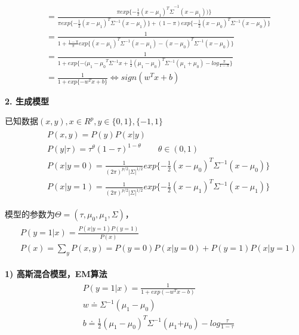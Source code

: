 \documentclass[12pt,UTF8,AutoFakeBold]{article}
\begin{document}
\begin{equation}
\begin{aligned}
&=\frac{\pi exp {\{ -\frac{1}{2} {(x-\mu_1)}^{T}\Sigma}^{-1}{(x-\mu_1))\}}} {\pi exp \{-\frac{1}{2}{(x-\mu_1)}^{T}\Sigma^{-1}(x-\mu_1)\}+(1-\pi)exp\{-\frac{1}{2} {(x-\mu_0)}^{T} \Sigma^{-1}(x-\mu_0)\}}\\
&=\frac{1}{1+\frac{1-\pi}{\pi}exp \{ {(x-\mu_1)}^{T} {\Sigma}^{-1} (x-\mu_1)-{(x-\mu_0)}^{T} {\Sigma}^{-1}(x-{\mu}_{0})\}}\\
&=\frac{1}{1+exp\{-{({\mu}_{1}-{\mu}_{0}}^{T}{\Sigma}^{-1}x+\frac{1}{2}{({\mu}_{1}-{\mu}_{0})}^{T}{\Sigma}^{-1}({\mu}_{1}+{\mu}_{0})-log\frac{\pi}{1-\pi}\}}\\
&=\frac{1}{1+exp\{-w^Tx+b\}} \Leftrightarrow sign(w^Tx+b)
\end{aligned}
\end{equation}

\textbf{2. 生成模型}

已知数据$(x,y),x\in R^p, y\in\{0,1\},\{-1,1\}$
\begin{gather}
\begin{aligned}
& P(x,y)=P(y)P(x|y)\\ 
& P(y|\tau )={ \tau  }^{ \theta }{ (1-\tau ) }^{ 1-\theta }\quad \quad \theta \in (0,1)\\ 
& P(x|y=0)=\frac { 1 }{ { (2\pi ) }^{ p/2 }{ \left| \Sigma  \right|  }^{ 1/2 } } exp\{ -\frac { 1 }{ 2 } { (x-{ \mu  }_{ 0 }) }^{ T }{ \Sigma  }^{ -1 }{ (x-{ \mu  }_{ 0 }) }\} \\ 
& P(x|y=1)=\frac { 1 }{ { (2\pi ) }^{ p/2 }{ \left| \Sigma  \right|  }^{ 1/2 } } exp\{ -\frac { 1 }{ 2 } { (x-{ \mu  }_{ 1 }) }^{ T }{ \Sigma  }^{ -1 }{ (x-{ \mu  }_{ 1 }) }\}
\end{aligned}
\end{gather}

模型的参数为$\Theta=(\tau, {\mu}_0, {\mu}_1, \Sigma) $，
\begin{gather}
\begin{aligned}
& P(y=1|x)=\frac { P(x|y=1)P(y=1) }{ P(x) } \\ 
& P(x)=\sum _{ y }^{  }{ P(x,y)=P(y=0)P(x|y=0)+P(y=1)P(x|y=1) } 
\end{aligned}
\end{gather}

\textbf{1) 高斯混合模型，EM算法}
\begin{gather}
\begin{aligned}
& P(y=1|x)=\frac { 1 }{ 1+exp(-w^{ T }x-b) } \\ 
& w\doteq { \Sigma  }^{ -1 }({ \mu  }_{ 1 }-{ \mu  }_{ 0 })\\ 
& b\doteq \frac { 1 }{ 2 } { ({ \mu  }_{ 1 }-{ \mu  }_{ 0 }) }^{ T }{ \Sigma  }^{ -1 }({ \mu  }_{ 1 }{ +\mu  }_{ 0 })-log\frac { \tau  }{ 1-\tau  } 
\end{aligned}
\end{gather}
\end{document}
